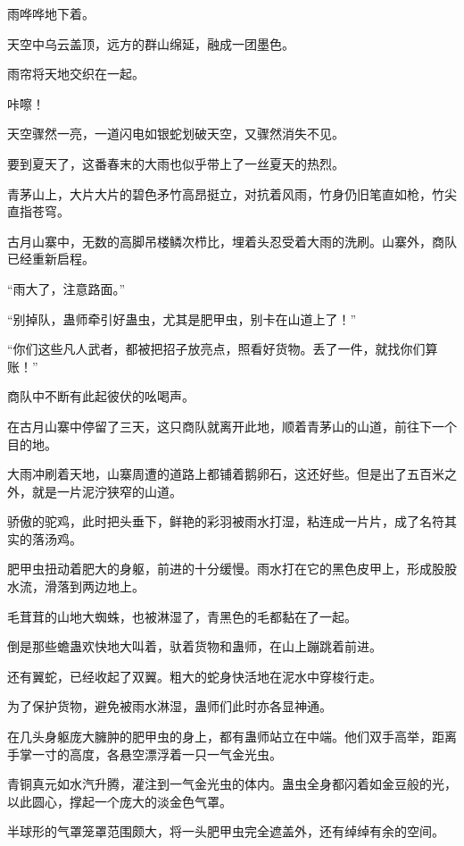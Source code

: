 
\begin{this_body}

雨哗哗地下着。

天空中乌云盖顶，远方的群山绵延，融成一团墨色。

雨帘将天地交织在一起。

咔嚓！

天空骤然一亮，一道闪电如银蛇划破天空，又骤然消失不见。

要到夏天了，这番春末的大雨也似乎带上了一丝夏天的热烈。

青茅山上，大片大片的碧色矛竹高昂挺立，对抗着风雨，竹身仍旧笔直如枪，竹尖直指苍穹。

古月山寨中，无数的高脚吊楼鳞次栉比，埋着头忍受着大雨的洗刷。山寨外，商队已经重新启程。

“雨大了，注意路面。”

“别掉队，蛊师牵引好蛊虫，尤其是肥甲虫，别卡在山道上了！”

“你们这些凡人武者，都被把招子放亮点，照看好货物。丢了一件，就找你们算账！”

商队中不断有此起彼伏的吆喝声。

在古月山寨中停留了三天，这只商队就离开此地，顺着青茅山的山道，前往下一个目的地。

大雨冲刷着天地，山寨周遭的道路上都铺着鹅卵石，这还好些。但是出了五百米之外，就是一片泥泞狭窄的山道。

骄傲的驼鸡，此时把头垂下，鲜艳的彩羽被雨水打湿，粘连成一片片，成了名符其实的落汤鸡。

肥甲虫扭动着肥大的身躯，前进的十分缓慢。雨水打在它的黑色皮甲上，形成股股水流，滑落到两边地上。

毛茸茸的山地大蜘蛛，也被淋湿了，青黑色的毛都黏在了一起。

倒是那些蟾蛊欢快地大叫着，驮着货物和蛊师，在山上蹦跳着前进。

还有翼蛇，已经收起了双翼。粗大的蛇身快活地在泥水中穿梭行走。

为了保护货物，避免被雨水淋湿，蛊师们此时亦各显神通。

在几头身躯庞大臃肿的肥甲虫的身上，都有蛊师站立在中端。他们双手高举，距离手掌一寸的高度，各悬空漂浮着一只一气金光虫。

青铜真元如水汽升腾，灌注到一气金光虫的体内。蛊虫全身都闪着如金豆般的光，以此圆心，撑起一个庞大的淡金色气罩。

半球形的气罩笼罩范围颇大，将一头肥甲虫完全遮盖外，还有绰绰有余的空间。


\end{this_body}
